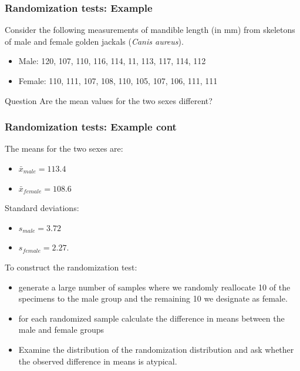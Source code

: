 \documentclass{beamer}
\begin{document}
\begin{frame}
  \frametitle{Randomization tests: Example}

Consider the following measurements of mandible length (in mm) from skeletons of male and female golden jackals (\emph{Canis aureus}).

\begin{itemize}
    \item Male: 120, 107, 110, 116, 114, 11, 113, 117, 114, 112
    \item Female: 110, 111, 107, 108, 110, 105, 107, 106, 111, 111
\end{itemize}

\begin{block}{Question}
Are the mean values for the two sexes different?
\end{block}

\end{frame}
\begin{frame}
  \frametitle{Randomization tests: Example cont}

The means for the two sexes are: 
\begin{itemize}
    \item $\bar{x}_{male} = 113.4$
    \item $\bar{x}_{female} = 108.6$ 
\end{itemize}

Standard deviations:
\begin{itemize}
    \item $s_{male} = 3.72$ 
    \item $s_{female} = 2.27$.
\end{itemize}
\medskip

To construct the randomization test:
\begin{itemize}
    \item generate a large number of samples where we randomly reallocate 10 of the specimens to the male group and the remaining 10 we designate as female. 
    \item for each randomized sample calculate the difference in means between the male and female groups
    \item Examine the distribution of the randomization distribution and ask whether the observed difference in means is atypical.

\end{itemize}




\end{frame}
\end{document}
